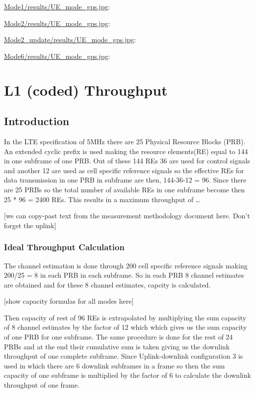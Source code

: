 \documentclass[a4paper,10pt]{article}
\newcommand{\printfile}[2][]{
 \begin{minipage}{8cm}
  \centering
  \url{#2}: #1

 \end{minipage}
}
\begin{document}
\printfile{Mode1/results/UE_mode_gps.jpg}
\printfile{Mode2/results/UE_mode_gps.jpg}

\printfile{Mode2_update/results/UE_mode_gps.jpg}
\printfile{Mode6/results/UE_mode_gps.jpg}

\section{L1 (coded) Throughput}


\subsection{Introduction}


In the LTE specification of 5MHz there are 25 Physical Resource Blocks (PRB). An extended cyclic prefix is used making the resource elements(RE) equal to 144 in one subframe of one PRB. Out of these 144 REs 36 are used for control signals and another 12 are used as cell specific reference signals so the effective REs for data transmission in one PRB in subframe are then, 144-36-12 = 96. Since there are 25 PRBs so the total number of available REs in one subframe become then 25 * 96 = 2400 REs. This results in a maximum throughput of \ldots

[we can copy-past text from the measurement methodology document here. Don't forget the uplink]

\subsubsection{Ideal Throughput Calculation}
The channel estimation is done through 200 cell specific reference signals making 200/25 = 8 in each PRB in each subframe. So in each PRB 8 channel estimates are obtained and for these 8 channel estimates, capcity is calculated. 

[show capacity formulas for all modes here]


Then capacity of rest of 96 REs is extrapolated by multiplying the sum capacity of 8 channel estimates by the factor of 12 which which gives us the sum capacity of one PRB for one subframe. The same procedure is done for the rest of 24 PRBs and at the end their cumulative sum is taken giving us the downlink throughput of one complete subframe. Since Uplink-downlink configuration 3 is used in which there are 6 downlink subframes in a frame so then the sum capacity of one subframe is multiplied by the factor of 6 to calculate the downlink throughput of one frame. 
\end{document}
